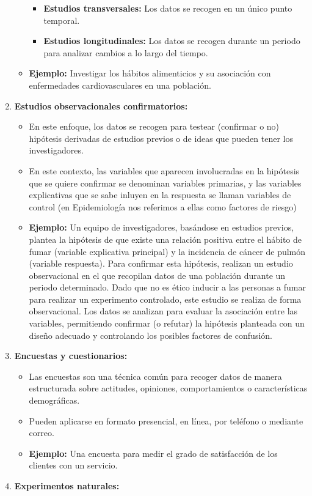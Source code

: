 \documentclass[
  letterpaper,
  DIV=11,
  numbers=noendperiod]{scrreprt}
\providecommand{\tightlist}{%
  \setlength{\itemsep}{0pt}\setlength{\parskip}{0pt}}
\begin{document}
\begin{tcolorbox}
\begin{enumerate}
\begin{itemize}
    \begin{itemize}
    \tightlist
    \item
      \textbf{Estudios transversales:} Los datos se recogen en un único
      punto temporal.
    \item
      \textbf{Estudios longitudinales:} Los datos se recogen durante un
      periodo para analizar cambios a lo largo del tiempo.
    \end{itemize}
  \item
    \textbf{Ejemplo:} Investigar los hábitos alimenticios y su
    asociación con enfermedades cardiovasculares en una población.
  \end{itemize}
\item
  \textbf{Estudios observacionales confirmatorios:}

  \begin{itemize}
  \tightlist
  \item
    En este enfoque, los datos se recogen para testear (confirmar o no)
    hipótesis derivadas de estudios previos o de ideas que pueden tener
    los investigadores.
  \item
    En este contexto, las variables que aparecen involucradas en la
    hipótesis que se quiere confirmar se denominan variables primarias,
    y las variables explicativas que se sabe inluyen en la respuesta se
    llaman variables de control (en Epidemiología nos referimos a ellas
    como factores de riesgo)
  \item
    \textbf{Ejemplo:} Un equipo de investigadores, basándose en estudios
    previos, plantea la hipótesis de que existe una relación positiva
    entre el hábito de fumar (variable explicativa principal) y la
    incidencia de cáncer de pulmón (variable respuesta). Para confirmar
    esta hipótesis, realizan un estudio observacional en el que
    recopilan datos de una población durante un periodo determinado.
    Dado que no es ético inducir a las personas a fumar para realizar un
    experimento controlado, este estudio se realiza de forma
    observacional. Los datos se analizan para evaluar la asociación
    entre las variables, permitiendo confirmar (o refutar) la hipótesis
    planteada con un diseño adecuado y controlando los posibles factores
    de confusión.
  \end{itemize}
\item
  \textbf{Encuestas y cuestionarios:}

  \begin{itemize}
  \tightlist
  \item
    Las encuestas son una técnica común para recoger datos de manera
    estructurada sobre actitudes, opiniones, comportamientos o
    características demográficas.
  \item
    Pueden aplicarse en formato presencial, en línea, por teléfono o
    mediante correo.
  \item
    \textbf{Ejemplo:} Una encuesta para medir el grado de satisfacción
    de los clientes con un servicio.
  \end{itemize}
\item
  \textbf{Experimentos naturales:}


\end{enumerate}
\end{tcolorbox}
\end{document}
